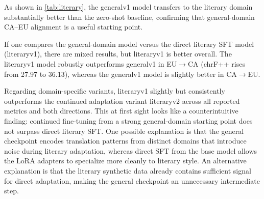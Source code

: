 \documentclass[11pt,a4paper]{article}
\begin{document}
\begin{table}[H]
\small
\centering
{}
\caption{Literary domain results. Bold: best per direction.}
\label{tab:literary}
\end{table}

As shown in \autoref{tab:literary}, the generalv1 model transfers to the literary domain substantially better
than the zero-shot baseline, confirming that
general-domain CA--EU alignment is a useful starting point.

If one compares the general-domain model versus the direct literary SFT model (literaryv1), there are mixed results, but literaryv1 is better overall.
The literaryv1 model robustly outperforms generalv1
in EU$\to$CA (chrF++ rises from
27.97 to 36.13), whereas the generalv1 model is slightly better in CA$\to$EU.

Regarding domain-specific variants, literaryv1 slightly but consistently outperforms the conti\-nued adaptation
variant literaryv2 across all reported metrics and both
directions. This at first sight looks like a counterintuitive finding: conti\-nued
fine-tuning from a strong general-domain starting point does not surpass
direct literary SFT. One possible explanation is that the general
checkpoint encodes translation patterns from distinct domains that introduce
noise during literary adaptation, whereas direct SFT from the base
model allows the LoRA adapters to specialize more cleanly to literary
style. An alternative explanation is that the literary synthetic data
already contains sufficient signal for direct adaptation, making the
general checkpoint an unnecessary intermediate step.
\end{document}
